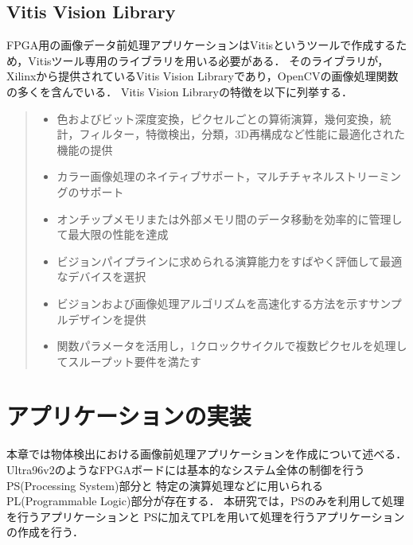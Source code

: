 \documentclass[11pt,a4j]{jreport}
\begin{document}
\section{Vitis Vision Library}
FPGA用の画像データ前処理アプリケーションはVitisというツールで作成するため，Vitisツール専用のライブラリを用いる必要がある．
そのライブラリが，Xilinxから提供されているVitis Vision Libraryであり，OpenCVの画像処理関数の多くを含んでいる．
Vitis Vision Libraryの特徴を以下に列挙する．
\begin{quote}
  \begin{itemize}
    \item 色およびビット深度変換，ピクセルごとの算術演算，幾何変換，統計，フィルター，特徴検出，分類，3D再構成など性能に最適化された機能の提供
    \item カラー画像処理のネイティブサポート，マルチチャネルストリーミングのサポート
    \item オンチップメモリまたは外部メモリ間のデータ移動を効率的に管理して最大限の性能を達成
    \item ビジョンパイプラインに求められる演算能力をすばやく評価して最適なデバイスを選択
    \item ビジョンおよび画像処理アルゴリズムを高速化する方法を示すサンプルデザインを提供
    \item 関数パラメータを活用し，1クロックサイクルで複数ピクセルを処理してスループット要件を満たす
  \end{itemize}
\end{quote}
%
\chapter{アプリケーションの実装}
本章では物体検出における画像前処理アプリケーションを作成について述べる．
Ultra96v2のようなFPGAボードには基本的なシステム全体の制御を行うPS(Processing System)部分と
特定の演算処理などに用いられるPL(Programmable Logic)部分が存在する．
本研究では，PSのみを利用して処理を行うアプリケーションと
PSに加えてPLを用いて処理を行うアプリケーションの作成を行う．
\end{document}
